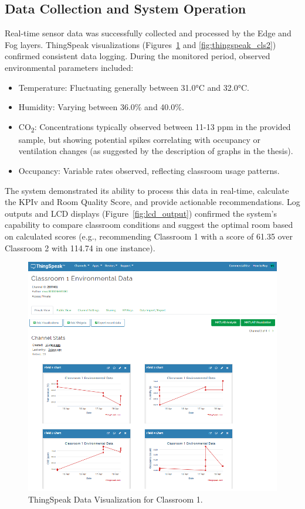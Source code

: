 \subsection{Data Collection and System Operation}
Real-time sensor data was successfully collected and processed by the Edge and Fog layers. ThingSpeak visualizations (Figures~\ref{fig:thingspeak_cls1} and \ref{fig:thingspeak_cls2}) confirmed consistent data logging. During the monitored period, observed environmental parameters included:
\begin{itemize}
    \item Temperature: Fluctuating generally between 31.0°C and 32.0°C.
    \item Humidity: Varying between 36.0\% and 40.0\%.
    \item CO\textsubscript{2}: Concentrations typically observed between 11-13 ppm in the provided sample, but showing potential spikes correlating with occupancy or ventilation changes (as suggested by the description of graphs in the thesis).
    \item Occupancy: Variable rates observed, reflecting classroom usage patterns.
\end{itemize}
The system demonstrated its ability to process this data in real-time, calculate the KPIv and Room Quality Score, and provide actionable recommendations. Log outputs and LCD displays (Figure~\ref{fig:lcd_output}) confirmed the system's capability to compare classroom conditions and suggest the optimal room based on calculated scores (e.g., recommending Classroom 1 with a score of 61.35 over Classroom 2 with 114.74 in one instance).

\begin{figure}[t]
  \centering
  \includegraphics[width=\columnwidth]{figures/cls1.png} %
  \caption{ThingSpeak Data Visualization for Classroom 1.}
  \label{fig:thingspeak_cls1}
\end{figure}

